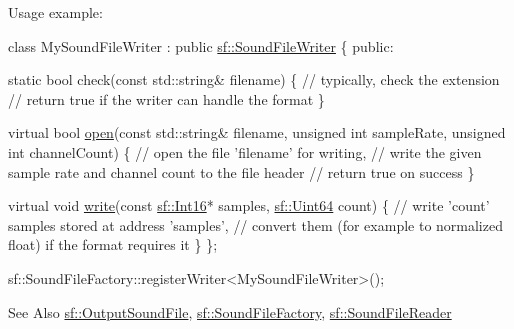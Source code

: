 Usage example\-: 
\begin{DoxyCode}
\textcolor{keyword}{class }MySoundFileWriter : \textcolor{keyword}{public} \hyperlink{classsf_1_1_sound_file_writer}{sf::SoundFileWriter}
\{
\textcolor{keyword}{public}:

    \textcolor{keyword}{static} \textcolor{keywordtype}{bool} check(\textcolor{keyword}{const} std::string& filename)
    \{
        \textcolor{comment}{// typically, check the extension}
        \textcolor{comment}{// return true if the writer can handle the format}
    \}

    \textcolor{keyword}{virtual} \textcolor{keywordtype}{bool} \hyperlink{classsf_1_1_sound_file_writer_a5c92bcaaa880ef4d3eaab18dae1d3d07}{open}(\textcolor{keyword}{const} std::string& filename, \textcolor{keywordtype}{unsigned} \textcolor{keywordtype}{int} sampleRate, \textcolor{keywordtype}{unsigned} \textcolor{keywordtype}{int} channelCount)
    \{
        \textcolor{comment}{// open the file 'filename' for writing,}
        \textcolor{comment}{// write the given sample rate and channel count to the file header}
        \textcolor{comment}{// return true on success}
    \}

    \textcolor{keyword}{virtual} \textcolor{keywordtype}{void} \hyperlink{classsf_1_1_sound_file_writer_a4ce597e7682d22c5b2c98d77e931a1da}{write}(\textcolor{keyword}{const} \hyperlink{namespacesf_a3c8e10435e2a310a7741755e66b5c94e}{sf::Int16}* samples, \hyperlink{namespacesf_add9ac83466d96b9f50a009b9f4064266}{sf::Uint64} count)
    \{
        \textcolor{comment}{// write 'count' samples stored at address 'samples',}
        \textcolor{comment}{// convert them (for example to normalized float) if the format requires it}
    \}
\};

sf::SoundFileFactory::registerWriter<MySoundFileWriter>();
\end{DoxyCode}


\begin{DoxySeeAlso}{See Also}
\hyperlink{classsf_1_1_output_sound_file}{sf\-::\-Output\-Sound\-File}, \hyperlink{classsf_1_1_sound_file_factory}{sf\-::\-Sound\-File\-Factory}, \hyperlink{classsf_1_1_sound_file_reader}{sf\-::\-Sound\-File\-Reader} 
\end{DoxySeeAlso}


